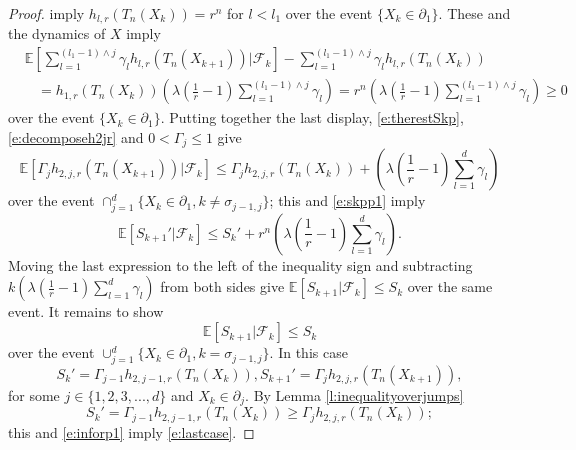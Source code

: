 \documentclass[10pt,a4paper]{amsart}
\begin{document}
\begin{proof}
imply $h_{l,r}(T_n(X_k)) = r^n$ for $l < l_1$
over the event $\{X_k \in \partial_1\}$.
These 
and the dynamics of $X$ imply
\begin{align*}
&{\mathbb E}
\left
[\sum_{l=1}^{(l_1 -1)\wedge j} \gamma_l h_{l,r}(T_n(X_{k+1}))
| {\mathscr F}_k \right] -
\sum_{l=1}^{(l_{1} -1)\wedge j} \gamma_l h_{l,r}(T_n(X_k))\\
&~~~~=
h_{1,r}(T_n(X_k))
\left(
\lambda \left( \frac{1}{r} - 1 \right)
\sum_{l=1}^{(l_{1} -1)\wedge j} \gamma_l 
\right) 
= 
r^n 
\left(
\lambda \left( \frac{1}{r} - 1 \right)
\sum_{l=1}^{(l_{1} -1)\wedge j} \gamma_l 
\right) 
\ge 0
\end{align*}
over the event $\{ X_k \in \partial_1\}.$ Putting together the last
display, \eqref{e:therestSkp}, \eqref{e:decomposeh2jr}
and $0 < \Gamma_j \le 1$
give
\begin{equation}\label{e:inforp1}
{\mathbb E}[ \Gamma_{j} h_{2,j,r}(T_n(X_{k+1}))| {\mathscr F}_k]
\le 
\Gamma_{j} h_{2,j,r}(T_n(X_{k})) + 
\left(
\lambda \left( \frac{1}{r} - 1 \right)
\sum_{l=1}^{d} \gamma_l 
\right)
\end{equation}
over the event 
$\cap_{j=1}^d \{X_k \in \partial_1, k \neq \sigma_{j-1,j}\}$;
this and \eqref{e:skpp1} imply
\[
{\mathbb E}[S_{k+1}' | {\mathscr F}_k] 
\le 
 S_{k}'  +
r^n
\left(
\lambda \left( \frac{1}{r} - 1 \right)
\sum_{l=1}^{d} \gamma_l 
\right).
\]
Moving the last expression to the left of the inequality sign
and
subtracting
$k 
\left(
\lambda \left( \frac{1}{r} - 1 \right)
\sum_{l=1}^{d} \gamma_l 
\right)
$ from both sides give
${\mathbb E}[S_{k+1} | {\mathscr F}_k] \le S_{k}$ over the same event.
It remains to show 
\begin{equation}\label{e:lastcase}
{\mathbb E}[S_{k+1} | {\mathscr F}_k] \le S_{k}
\end{equation}
over the event  
$\cup_{j=1}^d \{X_k \in \partial_1,  k = \sigma_{j-1,j} \}.$ 
In this case
\[
 S_{k}'=\Gamma_{j-1} h_{2,j-1,r}(T_n(X_{k})),
S_{k+1}' = \Gamma_j h_{2,j,r}(T_n(X_{k+1})),
\]
for some $j \in \{1,2,3,...,d\}$ and $X_k \in \partial_j.$
By Lemma \ref{l:inequalityoverjumps} 
\[
S_{k}'=\Gamma_{j-1} h_{2,j-1,r}(T_n(X_{k})) \ge
\Gamma_{j} h_{2,j,r}(T_n(X_{k}));
\]
this and \eqref{e:inforp1} imply \eqref{e:lastcase}.
\end{proof}
\end{document}
